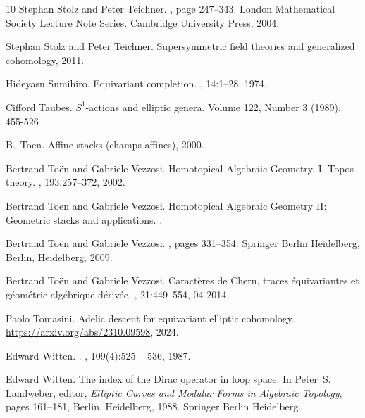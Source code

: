 \documentclass[11pt,letterpaper]{amsart}
\begin{document}
\begin{thebibliography}{10}
Stephan Stolz and Peter Teichner.
, page 247–343.
\newblock London Mathematical Society Lecture Note Series. Cambridge University
  Press, 2004.

Stephan Stolz and Peter Teichner.
\newblock Supersymmetric field theories and generalized cohomology, 2011.

Hideyasu Sumihiro.
\newblock Equivariant completion.
, 14:1--28, 1974.

Cifford Taubes.
\newblock $S^1$-actions and elliptic genera. 
 Volume 122, Number 3 (1989), 455-526

B.~Toen.
\newblock Affine stacks (champs affines), 2000.

Bertrand To{\"e}n and Gabriele Vezzosi.
\newblock Homotopical {A}lgebraic {G}eometry. {I}. {T}opos theory.
, 193:257--372, 2002.

Bertrand Toen and Gabriele Vezzosi.
\newblock Homotopical {A}lgebraic {G}eometry {II}: Geometric stacks and
  applications.
.

Bertrand To{\"e}n and Gabriele Vezzosi.
, pages 331--354.
\newblock Springer Berlin Heidelberg, Berlin, Heidelberg, 2009.


Bertrand Toën and Gabriele Vezzosi.
\newblock Caractères de {C}hern, traces équivariantes et géométrie
  algébrique dérivée.
, 21:449--554, 04 2014.

Paolo Tomasini.
\newblock Adelic descent for equivariant elliptic cohomology.
\newblock  \url{https://arxiv.org/abs/2310.09598}, 2024.


Edward Witten.
.
, 109(4):525 -- 536,
  1987.

Edward Witten.
\newblock The index of the {D}irac operator in loop space.
\newblock In Peter~S. Landweber, editor, {\em Elliptic Curves and Modular Forms
  in Algebraic Topology}, pages 161--181, Berlin, Heidelberg, 1988. Springer
  Berlin Heidelberg.
  

\end{thebibliography}
\end{document}
